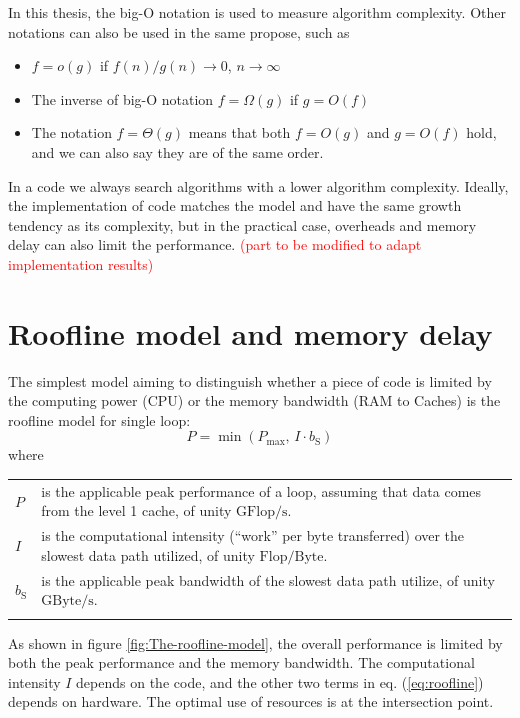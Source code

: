 In this thesis, the big-O notation is used to measure algorithm complexity.
Other notations can also be used in the same propose, such as 
\begin{itemize}
\item $f=o(g)$ if $f(n)/g(n)\rightarrow0$, $n\rightarrow\infty$
\item The inverse of big-O notation $f=\Omega(g)$ if $g=O(f)$
\item The notation $f=\Theta(g)$ means that both $f=O(g)$ and $g=O(f)$
hold, and we can also say they are of the same order.
\end{itemize}
In a code we always search algorithms with a lower algorithm complexity.
Ideally, the implementation of code matches the model and have the
same growth tendency as its complexity, but in the practical case,
overheads and memory delay can also limit the performance. \textcolor{red}{(part
to be modified to adapt implementation results)}


\section{Roofline model and memory delay}

The simplest model aiming to distinguish whether a piece of code is
limited by the computing power (CPU) or the memory bandwidth (RAM
to Caches) is the roofline model \citep{Williams_2009_roofline} for
single loop:
\begin{equation}
P=\min\left(P_{\max},\,I\cdot b_{\mathrm{S}}\right)\label{eq:roofline}
\end{equation}
where

\begin{tabular}{l>{\raggedright}p{}}
$P$ & is the applicable peak performance of a loop, assuming that data comes
from the level 1 cache, of unity $\mathrm{GFlop/s}$. \tabularnewline
$I$ & is the computational intensity (“work” per byte transferred) over
the slowest data path utilized, of unity $\mathrm{Flop/Byte}$. \tabularnewline
$b_{\mathrm{S}}$ & is the applicable peak bandwidth of the slowest data path utilize,
of unity $\mathrm{GByte/s}$.\tabularnewline
 & \tabularnewline
\end{tabular}

As shown in figure \ref{fig:The-roofline-model}, the overall performance
is limited by both the peak performance and the memory bandwidth.
The computational intensity $I$ depends on the code, and the other
two terms in eq. (\ref{eq:roofline}) depends on hardware. The optimal
use of resources is at the intersection point.

